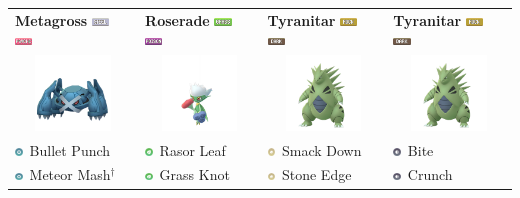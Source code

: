 \documentclass[12pt]{beamer}
\newcommand{\darkfull}{\includegraphics[height=0.2cm]{../../images/type/full/Dark.png}}
\newcommand{\grassfull}{\includegraphics[height=0.2cm]{../../images/type/full/Grass.png}}
\newcommand{\psychicfull}{\includegraphics[height=0.2cm]{../../images/type/full/Psychic.png}}
\newcommand{\rockfull}{\includegraphics[height=0.2cm]{../../images/type/full/Rock.png}}
\newcommand{\poisonfull}{\includegraphics[height=0.2cm]{../../images/type/full/Poison.png}}
\newcommand{\steelfull}{\includegraphics[height=0.2cm]{../../images/type/full/Steel.png}}
\newcommand{\darksimp}{\includegraphics[height=0.2cm]{../../images/type/simplified/dark.png}}
\newcommand{\rocksimp}{\includegraphics[height=0.2cm]{../../images/type/simplified/rock.png}}
\newcommand{\grasssimp}{\includegraphics[height=0.2cm]{../../images/type/simplified/grass.png}}
\newcommand{\steelsimp}{\includegraphics[height=0.2cm]{../../images/type/simplified/steel.png}}
\begin{document}
\begin{frame}
\begin{footnotesize}
\begin{block}{}
\begin{center}
\begin{tabular}{p{3cm}p{3cm}p{3cm}p{3cm}}
\textbf{Metagross} \hfill \steelfull~\psychicfull  & \textbf{Roserade} \hfill \grassfull~\poisonfull &  \textbf{Tyranitar} \hfill \rockfull~\darkfull &  \textbf{Tyranitar} \hfill \rockfull~\darkfull   \\
\multicolumn{1}{c}{\includegraphics[width=2cm]{../../images/pokemon/Metagross} }  &   \multicolumn{1}{c}{\includegraphics[width=2cm]{../../images/pokemon/Roserade} }  & \multicolumn{1}{c}{\includegraphics[width=2cm]{../../images/pokemon/Tyranitar} }  &   \multicolumn{1}{c}{\includegraphics[width=2cm]{../../images/pokemon/Tyranitar} }   \\
\steelsimp~Bullet Punch& \grasssimp~Rasor Leaf & \rocksimp~Smack Down  & \darksimp~Bite \\
\steelsimp~Meteor Mash$^{\dag}$ & \grasssimp~Grass Knot &\rocksimp~Stone Edge & \darksimp~Crunch\\
\end{tabular} 

\bigskip
\bigskip
\bigskip


\end{center}
\end{block}
\end{footnotesize}
\end{frame}
\end{document}
